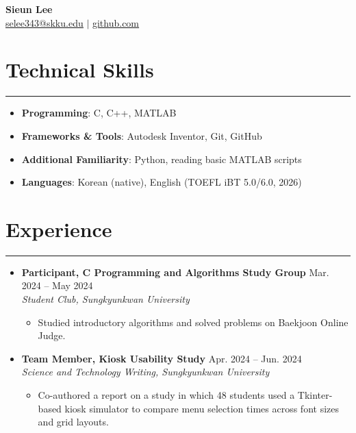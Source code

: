 \documentclass[letterpaper, 10pt]{article}
\begin{document}
\begin{center}
    \textbf{\LARGE Sieun Lee} \\ \vspace{2pt}
    \href{mailto:selee343@skku.edu}{\underline{selee343@skku.edu}} $|$
    \href{https://github.com/s1ipspace}{\underline{github.com}}
\end{center}

\section*{Technical Skills}
\hrule
\vspace{4pt}

\begin{itemize}[leftmargin=0pt, itemsep=0pt]
    \item[] \textbf{Programming}: C, C++, MATLAB
    \item[] \textbf{Frameworks \& Tools}: Autodesk Inventor, Git, GitHub
    \item[] \textbf{Additional Familiarity}: Python, reading basic MATLAB scripts
    \item[] \textbf{Languages}: Korean (native), English (TOEFL iBT 5.0/6.0, 2026)
\end{itemize}

\section*{Experience}
\hrule
\vspace{4pt}
\begin{itemize}[leftmargin=0pt]
    \item[]
        \textbf{Participant, C Programming and Algorithms Study Group} \hfill Mar. 2024 -- May 2024\\
        \textit{Student Club, Sungkyunkwan University}
        \begin{itemize}
            \item Studied introductory algorithms and solved problems on Baekjoon Online Judge.
        \end{itemize}

    \item[]
        \textbf{Team Member, Kiosk Usability Study} \hfill Apr. 2024 -- Jun. 2024\\
        \textit{Science and Technology Writing, Sungkyunkwan University}
        \begin{itemize}
            \item Co-authored a report on a study in which 48 students used a Tkinter-based kiosk simulator to compare menu selection times across font sizes and grid layouts.
        \end{itemize}
\end{itemize}
\end{document}
